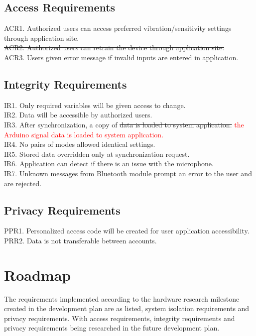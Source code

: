 \documentclass[12pt, titlepage]{article}
\begin{document}
\subsection{Access Requirements}

ACR1. Authorized users can access preferred vibration/sensitivity settings through application site.
\sout{\\ACR2. Authorized users can retrain the device through application site.}
\\ACR3. Users given error message if invalid inputs are entered in application.

\subsection{Integrity Requirements}

IR1. Only required variables will be given access to change.
\\IR2. Data will be accessible by authorized users.
\\ IR3. After synchronization, a copy of \sout{data is loaded to system application.} \textcolor{red}{the Arduino signal data is loaded to system application.}
\\IR4. No pairs of modes allowed identical settings.
\\IR5. Stored data overridden only at synchronization request.
\\IR6. Application can detect if there is an issue with the microphone.
\\IR7. Unknown messages from Bluetooth module prompt an error to the user and are rejected.
\subsection{Privacy Requirements}

PPR1. Personalized access code will be created for user application accessibility. 
\\PRR2. Data is not transferable between accounts.


\section{Roadmap}

The requirements implemented according to the hardware research milestone created in the development plan are as listed, system isolation requirements and privacy requirements. With access requirements, integrity requirements and privacy requirements being researched in the future development plan.
\end{document}

